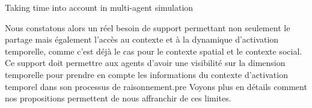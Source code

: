 \begin{frame}{Taking time into account in multi-agent simulation}
{\par Nous constatons alors un réel besoin de support permettant non seulement le partage mais également l’accès au contexte et à la dynamique d’activation temporelle, comme c’est déjà le cas pour le contexte spatial et le contexte social. Ce support doit permettre aux agents d’avoir une visibilité sur la dimension temporelle pour prendre en compte les informations du contexte d’activation temporel dans son processus de raisonnement.pre Voyons plus en détails comment nos propositions permettent de nous affranchir de ces limites.}
\end{frame}
